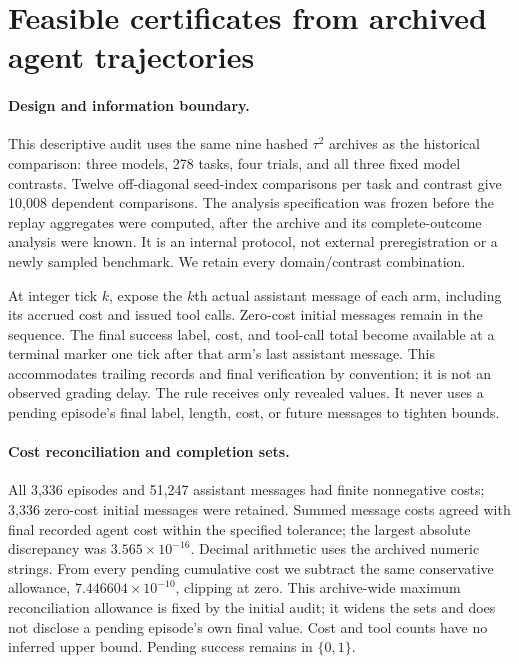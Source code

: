 \section{Feasible certificates from archived agent trajectories}
\label{app:trace_certificates}
\paragraph{Design and information boundary.}
This descriptive audit uses the same nine hashed $\tau^2$ archives as
the historical comparison: three models, 278 tasks, four trials, and all
three fixed model contrasts. Twelve off-diagonal seed-index comparisons
per task and contrast give 10,008 dependent comparisons. The analysis
specification was frozen before the replay aggregates were computed,
after the archive and its complete-outcome analysis were known. It is
an internal protocol, not external preregistration or a newly sampled
benchmark. We retain every domain/contrast combination.

At integer tick $k$, expose the $k$th actual assistant message of each
arm, including its accrued cost and issued tool calls. Zero-cost initial
messages remain in the sequence. The final success label, cost, and
tool-call total become available at a terminal marker one tick after
that arm's last assistant message. This accommodates trailing records
and final verification by convention; it is not an observed grading
delay. The rule receives only revealed values. It never uses a pending
episode's final label, length, cost, or future messages to tighten bounds.

\paragraph{Cost reconciliation and completion sets.}
All 3,336 episodes and 51,247 assistant messages had finite nonnegative
costs; 3,336 zero-cost initial messages were retained. Summed message
costs agreed with final recorded agent cost within the specified
tolerance; the largest absolute discrepancy was
$3.565\times10^{-16}$. Decimal arithmetic uses the archived numeric
strings. From every pending cumulative cost we subtract the same
conservative allowance, $7.446604\times10^{-10}$, clipping at zero.
This archive-wide maximum reconciliation allowance is fixed by the
initial audit; it widens the sets and does not disclose a pending
episode's own final value. Cost and tool counts have no inferred upper
bound. Pending success remains in $\{0,1\}$.

